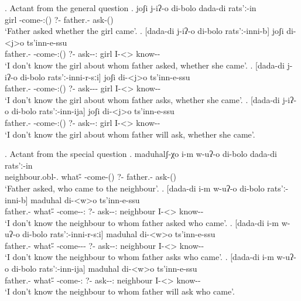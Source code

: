 \ex. Actant from the general question
	\ag. joʃi j-iʔ-o di-bolo dada-di rats'ː-in\\
			{girl} {\F-come-\Pst:(\Aor)} {?-\Indef} {father.\Obl-\Erg} {ask-\Pst(\Aor)}\\
			\glt `Father asked whether the girl came'.
	\bg. [dada-di  j-iʔ-o di-bolo rats'ː-inni-b] joʃi di-<j>o ts'inn-e-ssu\\
			{father.\Obl-\Erg} {\F-come-\Pst:(\Aor)} {?-\Indef} {ask-\Pst-\Ptcp:\Pst} {girl}  {I-<\F>\Aff} {know-\Hab-\Neg}\\
			\glt `I don't know the girl about whom father asked, whether she came'.
	\bg. [dada-di  j-iʔ-o di-bolo rats'ː-inni-r-sːi] joʃi di-<j>o ts'inn-e-ssu\\
			{father.\Obl-\Erg} {\F-come-\Pst:(\Aor)} {?-\Indef} {ask-\Pst-\Prog-\Attr} {girl}  {I-<\F>\Aff} {know-\Hab-\Neg}\\
			\glt `I don't know the girl about whom father asks, whether she came'.			
	\bg. [dada-di  j-iʔ-o di-bolo rats'ː-inn-ija] joʃi di-<j>o ts'inn-e-ssu\\
			{father.\Obl-\Erg} {\F-come-\Pst:(\Aor)} {?-\Indef} {ask-\Npst-\Ptcp:\Fut} {girl}  {I-<\F>\Aff} {know-\Hab-\Neg}\\
			\glt `I don't know the girl about whom father will ask, whether she came'.

\ex. Actant from the special question
	\ag. maduhalʃ-χo i-m w-uʔ-o di-bolo dada-di rats'ː-in\\
			{neighbour.obl-\Add.\Lat} {what-\H} {\M-come-\Pst(\Aor)} {?-\Indef} {father.\Obl-\Erg} {ask-\Pst(\Aor)}\\
			\glt `Father asked, who came to the neighbour'.
	\bg. [dada-di i-m w-uʔ-o di-bolo rats'ː-inni-b]  maduhal di-<w>o ts'inn-e-ssu\\
		{father.\Obl-\Erg}  {what-\H} {\M-come-\Pst-\Ptcp:\Pst} {?-\Indef} {ask-\Pst-\Ptcp:\Pst} neighbour {I-<\M>\Aff} {know-\Hab-\Neg}\\
		\glt `I don't know the neighbour to whom father asked who came'.
	\bg. [dada-di i-m w-uʔ-o di-bolo rats'ː-inni-r-sːi]  maduhal di-<w>o ts'inn-e-ssu\\
		{father.\Obl-\Erg}  {what-\H} {\M-come-\Pst-\Prog-\Attr} {?-\Indef} {ask-\Pst-\Ptcp:\Pst} neighbour {I-<\M>\Aff} {know-\Hab-\Neg}\\
		\glt `I don't know the neighbour to whom father asks who came'.		
	\bg. [dada-di i-m w-uʔ-o di-bolo rats'ː-inn-ija]  maduhal di-<w>o ts'inn-e-ssu\\
		{father.\Obl-\Erg}  {what-\H} {\M-come-\Ptcp:\Fut} {?-\Indef} {ask-\Npst-\Ptcp:\Fut} neighbour {I-<\M>\Aff} {know-\Hab-\Neg}\\
		\glt `I don't know the neighbour to whom father will ask who came'.

